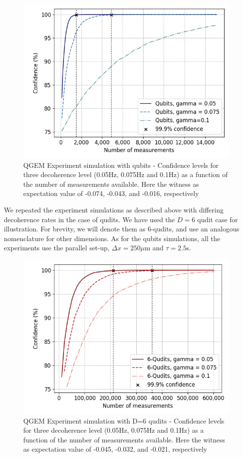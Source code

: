 \documentclass[%
 reprint,
 superscriptaddress,
 amsmath,
 amssymb,
 aps,
 longbibliography
]{revtex4-2}
\begin{document}
	\begin{figure}
    		\includegraphics[width=1.\columnwidth]{EW_confidence_qubits_deco.png}\par\medskip
	    \caption{QGEM Experiment simulation with qubits - Confidence levels for three decoherence level (0.05Hz, 0.075Hz and 0.1Hz) as a function of the number of measurements available. Here the witness as expectation value of -0.074, -0.043, and -0.016, respectively} \label{fig:expsim_qubits_deco}
	\end{figure}
\indent We repeated the experiment simulations as described above with differing decoherence rates in the case of qudits. We have used the $D=6$ qudit case for illustration. For brevity, we will denote them as 6-qudits, and use an analogous nomenclature for other dimensions. As for the qubits simulations, all the experiments use the parallel set-up, $\Delta x = 250 \mu$m and $\tau = 2.5$s.\\
	\begin{figure}
    		\includegraphics[width=1.\columnwidth]{EW_confidence_6qudits_deco.png}\par\medskip
	    \caption{QGEM Experiment simulation with D=6 qudits - Confidence levels for three decoherence level (0.05Hz, 0.075Hz and 0.1Hz) as a function of the number of measurements available. Here the witness as expectation value of -0.045, -0.032, and -0.021, respectively} \label{fig:expsim_qubits_deco_6d}
	\end{figure} 
\end{document}
